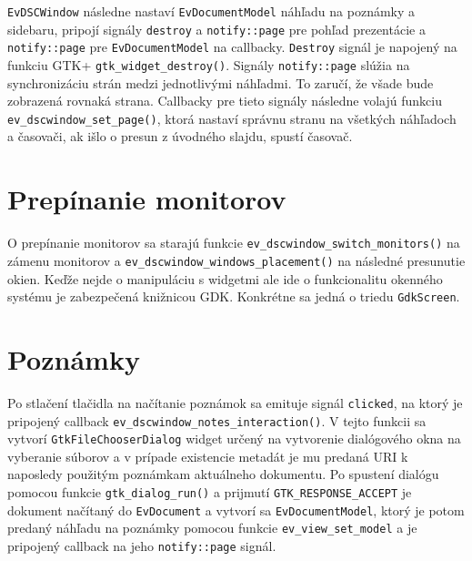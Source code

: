 \documentclass[12pt,oneside,final]{fithesis2}
\begin{document}
\texttt{EvDSCWindow} následne nastaví \texttt{EvDocumentModel} náhľadu na poznámky a sidebaru, pripojí signály \texttt{destroy} a \texttt{notify::page} pre pohľad prezentácie a \texttt{notify::page} pre \texttt{EvDocumentModel} na callbacky. \texttt{Destroy} signál je napojený na funkciu GTK+ \texttt{gtk\_\-widget\_\-destroy()}. Signály \texttt{notify::page} slúžia na synchronizáciu strán medzi jednotlivými náhľadmi. To zaručí, že všade bude zobrazená rovnaká strana. Callbacky pre tieto signály následne volajú funkciu \texttt{ev\_\-dscwindow\_\-set\_\-page()}, ktorá nastaví správnu stranu na všetkých náhľadoch a časovači, ak išlo o presun z úvodného slajdu, spustí časovač.
\section{Prepínanie monitorov}
O prepínanie monitorov sa starajú funkcie \texttt{ev\_\-dscwindow\_\-switch\_\-monitors()} na zámenu monitorov a \texttt{ev\_\-dscwindow\_\-windows\_\-placement()} na následné presunutie okien. Keďže nejde o manipuláciu s widgetmi ale ide o funkcionalitu okenného systému je zabezpečená knižnicou GDK. Konkrétne sa jedná o triedu \texttt{GdkScreen}.
\section{Poznámky}
Po stlačení tlačidla na načítanie poznámok sa emituje signál \texttt{clicked}, na ktorý je pripojený callback \texttt{ev\_\-dscwindow\_\-notes\_\-interaction()}. V tejto funkcii sa vytvorí \texttt{GtkFileChooserDialog} widget určený na vytvorenie dialógového okna na vyberanie súborov a v prípade existencie metadát je mu predaná URI k naposledy použitým poznámkam aktuálneho dokumentu. Po spustení dialógu pomocou funkcie \texttt{gtk\_\-dialog\_\-run()} a prijmutí \texttt{GTK\_\-RESPONSE\_\-ACCEPT} je dokument načítaný do \texttt{EvDocument} a vytvorí sa \texttt{EvDocumentModel}, ktorý je potom predaný náhľadu na poznámky pomocou funkcie \texttt{ev\_\-view\_\-set\_\-model} a je pripojený callback na jeho \texttt{notify::page} signál.
\end{document}
